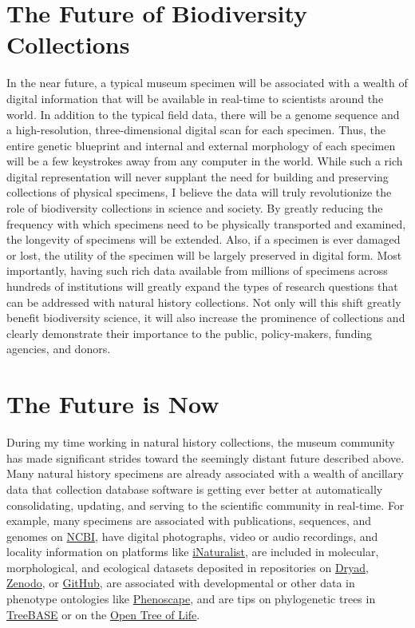 \documentclass[10pt]{article}
\begin{document}
\section*{The Future of Biodiversity Collections}
In the near future, a typical museum specimen will be associated
with a wealth of digital information that will be available in real-time
to scientists around the world.
In addition to the typical field data, there will be a genome sequence and a
high-resolution, three-dimensional digital scan for each specimen.
Thus, the entire genetic blueprint and internal and external morphology of 
each specimen will be a few keystrokes away from any computer in the world.
While such a rich digital representation will never supplant the need for
building and preserving collections of physical specimens, I believe the data
will truly revolutionize the role of biodiversity collections in science and
society.
By greatly reducing the frequency with which specimens need to be physically
transported and examined, the longevity of specimens will be extended.
Also, if a specimen is ever damaged or lost, the utility of the specimen will
be largely preserved in digital form.
Most importantly, having such rich data available from millions of specimens
across hundreds of institutions will greatly expand the types of research
questions that can be addressed with natural history collections.
Not only will this shift greatly benefit biodiversity science, it will also
increase the prominence of collections and clearly demonstrate their importance
to the public, policy-makers, funding agencies, and donors.


\section*{The Future is Now}
During my time working in natural history collections, the museum
community has made significant strides toward the seemingly distant
future described above.
Many natural history specimens are already associated with a wealth of
ancillary data that collection database software is getting ever better at
automatically consolidating,
updating, and serving to the scientific community in real-time.
For example, many specimens 
are associated with publications, sequences, and genomes on
\href{http://www.ncbi.nlm.nih.gov}{NCBI},
have digital photographs, video or audio recordings, and locality information
on platforms like
\href{https://www.inaturalist.org/}{iNaturalist},
are included in molecular, morphological, and ecological datasets deposited in
repositories on
\href{http://datadryad.org}{Dryad},
\href{https://zenodo.org/}{Zenodo},
or
\href{https://github.com/}{GitHub},
are associated with developmental or other data in
phenotype ontologies
like
\href{https://phenoscape.org/}{Phenoscape},
and are tips on phylogenetic trees in
\href{http://treebase.org}{TreeBASE} or on the
\href{http://opentreeoflife.org}{Open Tree of Life}.
\end{document}
